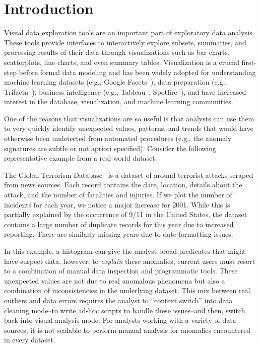 \section{Introduction}\label{intro}\sloppy
Visual data exploration tools are an important part of exploratory 
data analysis. These tools provide interfaces to interactively explore subsets, summaries, and processing results of their data through visualizations such as bar charts, scatterplots, line charts, and even summary tables.  Visualization is a crucial first-step before formal data modeling and has been widely adopted for understanding machine learning datasets (e.g., Google Facets~\cite{googlefacets}), data preparation (e.g., Trifacta~\cite{trifacta}), business intelligence (e.g., Tableau~\cite{stolte2002polaris}, Spotfire~\cite{shneiderman1999dynamic}), and have increased interest in the database, visualization, and machine learning communities. 

One of the reasons that visualizations are so useful is that analysts can use them to very quickly identify unexpected values, patterns, and trends that would have otherwise been undetected from automated procedures (e.g., the anomaly signatures are subtle or not apriori specified).  Consider the following representative example from a real-world dataset: 
\begin{example}[Terrorism]
The Global Terrorism Database~\cite{data-terrorism} is a dataset of around terrorist attacks scraped from news sources.  Each record contains the date, location, details about the attack, and the number of fatalities and injuries.  If we plot the number of incidents for each year, we notice a major increase for 2001. While this is partially explained by the occurrence of 9/11 in the United States, the dataset contains a large number of duplicate records for this year due to increased reporting. There are similarly missing years due to date formatting issues.
\label{e:terrorism}
\end{example}
In this example, a histogram can give the analyst broad predicates that might have suspect data, however, to {\it explain} these anomalies, current users must resort to a combination of manual data inspection and programmatic tools. These unexpected values are not due to real anomalous phenomena but also a combination of inconsistencies in the underlying dataset.  This mix between real outliers and data errors requires the analyst to ``context switch'' into data cleaning mode--to write ad-hoc scripts to handle these issues--and then, switch back into visual analysis mode. For analysts working with a variety of data sources, it is not scalable to perform manual analysis for anomalies encountered in every dataset.

